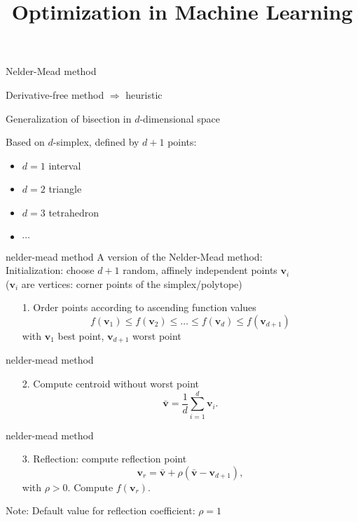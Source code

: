 \documentclass[11pt,compress,t,notes=noshow, xcolor=table]{beamer}
\title{Optimization in Machine Learning}
\newcommand{\vb}{\mathbf{v}}
\begin{document}

\begin{framei}{Nelder-Mead method}
\item Derivative-free method $\Rightarrow$ heuristic
\item Generalization of bisection in $d$-dimensional space
\item Based on $d$-simplex, defined by $d + 1$ points:
\begin{itemize}
\item $d = 1$ interval
\item $d = 2$ triangle
\item $d = 3$ tetrahedron
\item $\cdots$
\end{itemize}
\end{framei}

\begin{frame2}{nelder-mead method}
A version of the Nelder-Mead method:\\
\lz
Initialization: choose $d + 1$ random, affinely independent points $\vb_i$\\ ($\vb_i$ are vertices: corner points of the simplex/polytope)
\lz
\begin{enumerate}
\item[1.] Order points according to ascending function values
$$f(\vb_1) \leq f(\vb_2) \leq \ldots \leq f(\vb_d) \leq f(\vb_{d + 1})$$
with $\vb_1$ best point, $\vb_{d + 1}$ worst point
\end{enumerate}
\end{frame2}

\begin{frame2}{nelder-mead method}
\begin{enumerate}
\item[2.] Compute centroid without worst point
$$\bar{\vb} = \frac{1}{d} \sum_{i = 1}^d \vb_i.$$
\end{enumerate}
\end{frame2}

\begin{frame2}{nelder-mead method}
\begin{enumerate}
\item[3.] Reflection: compute reflection point
$$\vb_r = \bar{\vb} + \rho (\bar{\vb} - \vb_{d + 1}),$$
with $\rho > 0$.
Compute $f(\vb_r)$.
\end{enumerate}
\lz
Note: Default value for reflection coefficient: $\rho = 1$
\end{frame2}
\end{document}
